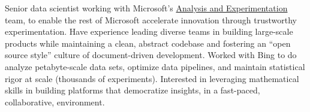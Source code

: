 \documentclass[11pt, letterpaper]{awesome-cv}
\begin{document}
\makecvheader






\begin{cvparagraph}
Senior data scientist working with Microsoft's \href{http://www.exp-platform.com/}{Analysis and Experimentation} team, to enable the rest of Microsoft accelerate innovation through trustworthy experimentation.
Have experience leading diverse teams in building large-scale products while maintaining a clean, abstract codebase and fostering an ``open source style'' culture of document-driven development.
Worked with Bing to do analyze petabyte-scale data sets, optimize data pipelines, and maintain statistical rigor at scale (thousands of experiments).
Interested in leveraging mathematical skills in building platforms that democratize insights, in a fast-paced, collaborative, environment.
\end{cvparagraph}





\end{document}

